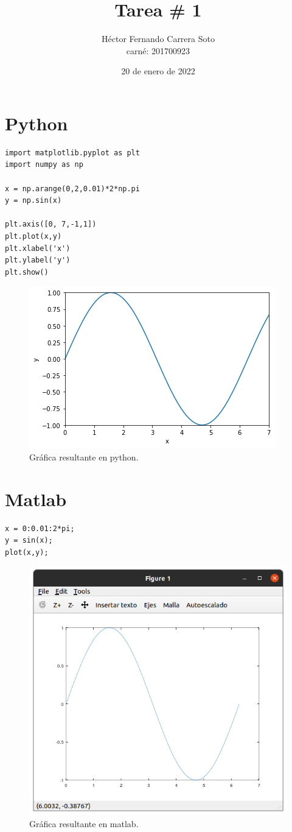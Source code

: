 \documentclass[12pt,letterpaper]{article}
\author{Héctor Fernando Carrera Soto \\ carné: 201700923}
\title{Tarea \# 1}
\date{20 de enero de 2022}
\begin{document}
\maketitle

\section{Python}

\begin{verbatim}
import matplotlib.pyplot as plt
import numpy as np

x = np.arange(0,2,0.01)*2*np.pi
y = np.sin(x)

plt.axis([0, 7,-1,1])
plt.plot(x,y)
plt.xlabel('x')
plt.ylabel('y')
plt.show()
\end{verbatim}

\begin{figure}[H]
\centering
\includegraphics[scale=0.6]{matlab_graf_py.png}
\caption{Gráfica resultante en python.}
\end{figure}


\section{Matlab}

\begin{verbatim}
x = 0:0.01:2*pi;
y = sin(x);
plot(x,y);
\end{verbatim}

\begin{figure}[H]
\centering
\includegraphics[scale=0.5]{matlab_graf.png}
\caption{Gráfica resultante en matlab.}
\end{figure}
\end{document}
